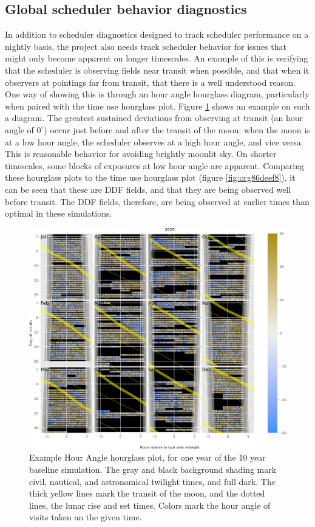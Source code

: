 \subsection{Global scheduler behavior diagnostics}
\label{sec:org08bda6a}
In addition to scheduler diagnostics designed to track scheduler performance on a nightly basis, the project also needs track scheduler behavior for issues that might only become apparent on longer timescales.
An example of this is verifying that the scheduler is observing fields near transit when possible, and that when it observers at pointings far from transit, that there is a well understood reason.
One way of showing this is through an hour angle hourglass diagram, particularly when paired with the time use hourglass plot.
Figure \ref{fig:orgbafa463} shows an example on such a diagram.
The greatest sustained deviations from observing at transit (an hour angle of \(0^{\circ}\)) occur just before and after the transit of the moon: when the moon is at a low hour angle, the scheduler observes at a high hour angle, and vice versa.
This is reasonable behavior for avoiding brightly moonlit sky.
On shorter timescales, some blocks of exposures at low hour angle are apparent.
Comparing these hourglass plots to the time use hourglass plot (figure \ref{fig:org86deef8}), it can be seen that these are DDF fields, and that they are being observed well before transit.
The DDF fields, therefore, are being observed at earlier times than optimal in these simulations.

\begin{figure}[htbp]
\centering
\includegraphics[width=1.0\textwidth]{./figures/hour_angle_hourglass.png}
\caption{\label{fig:orgbafa463}Example Hour Angle hourglass plot, for one year of the 10 year baseline simulation. The gray and black background shading mark civil, nautical, and astronomical twilight times, and full dark. The thick yellow lines mark the transit of the moon, and the dotted lines, the lunar rise and set times. Colors mark the hour angle of visits taken an the given time.}
\end{figure}



